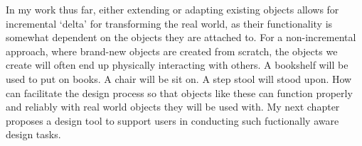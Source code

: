 
%
%
%
%
% 
%
%


In my work thus far, either extending or adapting existing objects allows for incremental `delta' for transforming the real world, as their functionality is somewhat dependent on the objects they are attached to. For a non-incremental approach, where brand-new objects are created from scratch, the objects we create will often end up physically interacting with others. A bookshelf will be used to put on books. A chair will be sit on. A step stool will stood upon. How can facilitate the design process so that objects like these can function properly and reliably with real world objects they will be used with. My next chapter proposes a design tool to support users in conducting such fuctionally aware design tasks.